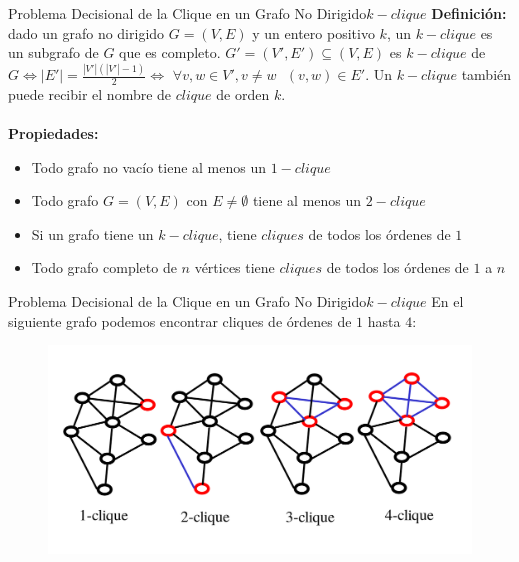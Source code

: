 \documentclass[10pt, envcountsect, presentation, aspectratio=169]{beamer}
\begin{document}

\begin{frame}{Problema Decisional de la Clique en un Grafo No Dirigido}{$k-clique$}
    \textbf{Definición:} dado un grafo no dirigido $G=(V,E)$ y un entero positivo $k$, un $k-clique$ es un subgrafo de $G$ que es completo. $G'=(V',E') \subseteq (V,E)$ es $k-clique$ de $G \Leftrightarrow |E'| = \frac{|V'|(|V'|-1)}{2} \Leftrightarrow$ $\forall v, w \in V', v \neq w \text{ } (v,w)\in E'$. Un $k-clique$ también puede recibir el nombre de $clique$ de orden $k$. \\~\\

    \textbf{Propiedades:}

    \begin{itemize}
        \item[] Todo grafo no vacío tiene al menos un $1-clique$
        \item[] Todo grafo $G=(V,E)$ con $E \neq \emptyset$ tiene al menos un $2-clique$
        \item[] Si un grafo tiene un $k-clique$, tiene $cliques$ de todos los órdenes de $1$ 
        \item[] Todo grafo completo de $n$ vértices tiene $cliques$ de todos los órdenes de $1$ a $n$
    \end{itemize}
    
\end{frame}

\begin{frame}{Problema Decisional de la Clique en un Grafo No Dirigido}{$k-clique$}
    En el siguiente grafo podemos encontrar cliques de órdenes de $1$ hasta $4$:
    \begin{figure}
        \includegraphics[scale=0.25]{images/T2_2_ejemploclique.png}
    \end{figure} 
\end{frame}
\end{document}
